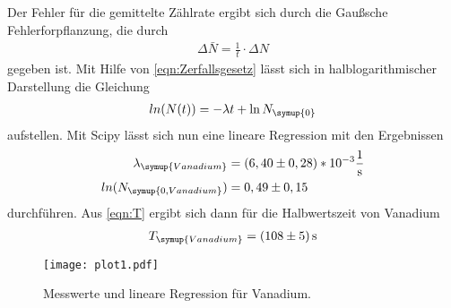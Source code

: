 Der Fehler für die gemittelte Zählrate ergibt sich durch die Gaußsche Fehlerforpflanzung, die durch
\begin{align*}
  \Delta\bar{N} = \frac{1}{t}\cdot\Delta N
\end{align*}
gegeben ist. Mit Hilfe von \autoref{eqn:Zerfallsgesetz} lässt sich in halblogarithmischer Darstellung die
Gleichung
\begin{align*}
  ln(N(t)) = -\lambda t + \ln{N_{\symup{0}}}
\end{align*}
aufstellen. Mit Scipy lässt sich nun eine lineare Regression mit den Ergebnissen
\begin{align*}
  \lambda_{\symup{Vanadium}} &= (6,40 \pm 0,28)*10^{-3} \frac{1}{\unit{\second}} \\
  ln(N_{\symup{0, Vanadium}}) &= 0,49 \pm 0,15 \\
\end{align*}
durchführen. Aus \autoref{eqn:T} ergibt sich dann für die Halbwertszeit von Vanadium
\begin{align*}
  T_{\symup{Vanadium}} = (108 \pm 5)\,\unit{\second}
\end{align*}

\begin{figure}
  \centering
  \texttt{[image: plot1.pdf]}
  \caption{Messwerte und lineare Regression für Vanadium.}
  \label{fig:vanadium}
\end{figure}

